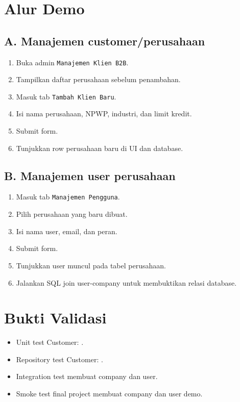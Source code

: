 \documentclass[11pt,a4paper]{article}
\begin{document}
\section*{Alur Demo}
\subsection*{A. Manajemen customer/perusahaan}
\begin{enumerate}
\item Buka admin \texttt{Manajemen Klien B2B}.
\item Tampilkan daftar perusahaan sebelum penambahan.
\item Masuk tab \texttt{Tambah Klien Baru}.
\item Isi nama perusahaan, NPWP, industri, dan limit kredit.
\item Submit form.
\item Tunjukkan row perusahaan baru di UI dan database.
\end{enumerate}

\subsection*{B. Manajemen user perusahaan}
\begin{enumerate}
\item Masuk tab \texttt{Manajemen Pengguna}.
\item Pilih perusahaan yang baru dibuat.
\item Isi nama user, email, dan peran.
\item Submit form.
\item Tunjukkan user muncul pada tabel perusahaan.
\item Jalankan SQL join user-company untuk membuktikan relasi database.
\end{enumerate}

\section*{Bukti Validasi}
\begin{itemize}
\item Unit test Customer: .
\item Repository test Customer: .
\item Integration test membuat company dan user.
\item Smoke test final project membuat company dan user demo.
\end{itemize}
\end{document}
